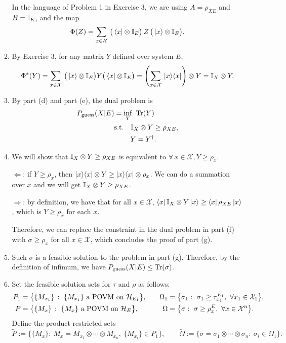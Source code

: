 \documentclass[12pt]{article}
\newcommand{\pguess}{P_{\rm guess}}
\begin{document}
\begin{enumerate}
\begin{enumerate}
In the language of Problem 1 in Exercise 3, we are using $A = \rho_{XE}$ and $B = \mathbb{I}_E$, and the map $$\Phi(Z) = \sum_{x\in\mathcal{X}} \,\big(\bra{x} \otimes \mathbb{I}_E\big) \,Z\, \big(\ket{x}\otimes\mathbb{I}_E\big).$$
\item By Exercise 3, for any matrix $Y$ defined over system $E$, $$\Phi^*(Y) = \sum_{x\in\mathcal{X}} \, \big(\ket{x}\otimes\mathbb{I}_E\big) Y \big(\bra{x} \otimes \mathbb{I}_E\big) = \left(\sum_{x\in\mathcal{X}} \, \ket{x}\!\bra{x}\right)\otimes Y  = \mathbb{I}_X \otimes Y.$$
\item By part (d) and part (e), the dual problem is
\begin{align*}
\pguess(X|E) &=\inf_{Y}\ \Tr(Y)\\
\quad &\text{s.t.}\quad
\Id_X \otimes Y \ge \rho_{XE}, \\
&\quad \quad \; Y=Y^\dagger.
\end{align*}
\item We will show that $\mathbb{I}_X \otimes Y \ge \rho_{XE}$ is equivalent to $\forall\, x \in \mathcal{X}, Y \ge \rho_x$.

$\Leftarrow$: if $Y \ge \rho_x$, then $\ket{x}\!\bra{x} \otimes Y \ge \ket{x}\!\bra{x} \otimes \rho_x$. We can do a summation over $x$ and we will get $\mathbb{I}_X \otimes Y \ge \rho_{XE}$.

$\Rightarrow$: by definition, we have that for all $x \in \mathcal{X}$, $\bra{x}\mathbb{I}_X \otimes Y \ket{x} \ge \bra{x}\rho_{XE}\ket{x}$, which is $Y \ge \rho_x$ for each $x$.

Therefore, we can replace the constraint in the dual problem in part (f) with $\sigma \ge \rho_x$ for all $x \in \mathcal{X}$, which concludes the proof of part (g).
\item Such $\sigma$ is a feasible solution to the problem in part (g). Therefore, by the definition of infimum, we have $\pguess(X|E)\leq \Tr(\sigma)$.
\item Set the feasible solution sets for $\tau$ and $\rho$ as follows:
\[
\begin{aligned}
P_1&=\big\{\{M_{x_1}\}\,:\ \{M_{x_1}\}\text{ a POVM on }\mH_{E_1}\big\},\quad
&\Omega_1&=\big\{\sigma_1:\ \sigma_1 \ge \tau_{x_1}^{E_1},\ \forall x_1\in\mathcal{X}_1\big\},\\
P&=\big\{\{M_x\}\,:\ \{M_x\}\text{ a POVM on }\mH_{E}\big\},\quad
&\Omega&=\big\{\sigma:\ \sigma\ge \rho_x^{E},\ \forall x\in\mathcal{X}^{n}\big\}.
\end{aligned}
\]
Define the product-restricted sets
\[
\tilde P := \Big\{\{M_x\}:\ M_x=M_{x_1}\otimes\cdots\otimes M_{x_n},\ 
\{M_{x_i}\}\in P_1\Big\},\qquad
\tilde \Omega := \Big\{\sigma=\sigma_1\otimes\cdots\otimes\sigma_n:\ \sigma_i\in\Omega_1\Big\}.
\]


\end{enumerate}
\end{enumerate}
\end{document}
